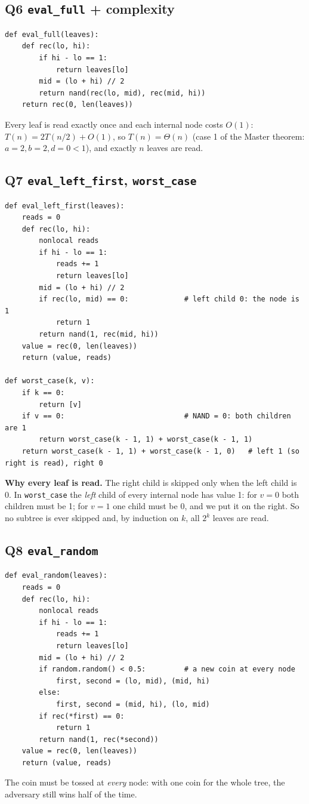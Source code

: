 \documentclass[11pt,a4paper]{article}
\newcommand{\pts}[3]{\fcolorbox{#3}{white}{\color{#3}\textbf{#1\,/\,#2}}}
\begin{document}
\subsection*{Q6 \quad \texttt{eval\_full} + complexity \hfill \pts{0}{1}{none}}
\begin{lstlisting}
def eval_full(leaves):
    def rec(lo, hi):
        if hi - lo == 1:
            return leaves[lo]
        mid = (lo + hi) // 2
        return nand(rec(lo, mid), rec(mid, hi))
    return rec(0, len(leaves))
\end{lstlisting}
Every leaf is read exactly once and each internal node costs $O(1)$:
$T(n)=2T(n/2)+O(1)$, so $T(n)=\Theta(n)$ (case 1 of the Master theorem: $a=2,b=2,d=0<1$), and
exactly $n$ leaves are read.

\subsection*{Q7 \quad \texttt{eval\_left\_first}, \texttt{worst\_case} \hfill \pts{0}{2}{none}}
\begin{lstlisting}
def eval_left_first(leaves):
    reads = 0
    def rec(lo, hi):
        nonlocal reads
        if hi - lo == 1:
            reads += 1
            return leaves[lo]
        mid = (lo + hi) // 2
        if rec(lo, mid) == 0:             # left child 0: the node is 1
            return 1
        return nand(1, rec(mid, hi))
    value = rec(0, len(leaves))
    return (value, reads)

def worst_case(k, v):
    if k == 0:
        return [v]
    if v == 0:                            # NAND = 0: both children are 1
        return worst_case(k - 1, 1) + worst_case(k - 1, 1)
    return worst_case(k - 1, 1) + worst_case(k - 1, 0)   # left 1 (so right is read), right 0
\end{lstlisting}
\textbf{Why every leaf is read.} The right child is skipped only when the left child is 0. In
\texttt{worst\_case} the \emph{left} child of every internal node has value 1: for $v=0$ both
children must be 1; for $v=1$ one child must be 0, and we put it on the right. So no subtree is ever
skipped and, by induction on $k$, all $2^k$ leaves are read.

\subsection*{Q8 \quad \texttt{eval\_random} \hfill \pts{0}{2}{none}}
\begin{lstlisting}
def eval_random(leaves):
    reads = 0
    def rec(lo, hi):
        nonlocal reads
        if hi - lo == 1:
            reads += 1
            return leaves[lo]
        mid = (lo + hi) // 2
        if random.random() < 0.5:         # a new coin at every node
            first, second = (lo, mid), (mid, hi)
        else:
            first, second = (mid, hi), (lo, mid)
        if rec(*first) == 0:
            return 1
        return nand(1, rec(*second))
    value = rec(0, len(leaves))
    return (value, reads)
\end{lstlisting}
The coin must be tossed at \emph{every} node: with one coin for the whole tree, the adversary
still wins half of the time.
\end{document}
